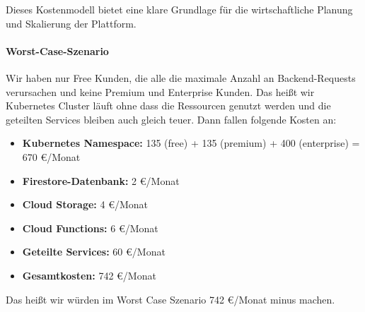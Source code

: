Dieses Kostenmodell bietet eine klare Grundlage für die wirtschaftliche Planung und Skalierung der Plattform.

\paragraph{Worst-Case-Szenario}
Wir haben nur Free Kunden, die alle die maximale Anzahl an Backend-Requests verursachen und keine Premium und Enterprise Kunden.
Das heißt wir Kubernetes Cluster läuft ohne dass die Ressourcen genutzt werden und die geteilten Services bleiben auch gleich teuer.
Dann fallen folgende Kosten an:
\begin{itemize}
	\item \textbf{Kubernetes Namespace:} 135 (free) + 135 (premium) + 400 (enterprise) = 670 €/Monat
	\item \textbf{Firestore-Datenbank:} 2 €/Monat
	\item \textbf{Cloud Storage:} 4 €/Monat
	\item \textbf{Cloud Functions:} 6 €/Monat
	\item \textbf{Geteilte Services:} 60 €/Monat
	\item \textbf{Gesamtkosten:} 742 €/Monat
\end{itemize}
Das heißt wir würden im Worst Case Szenario 742 €/Monat minus machen.

